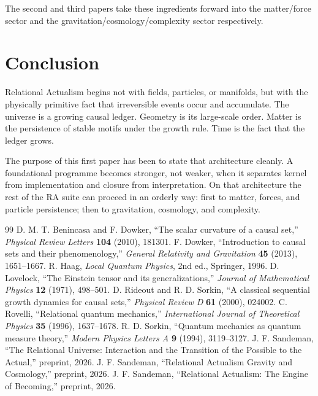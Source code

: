 \documentclass[11pt]{article}
\begin{document}
The second and third papers take these ingredients forward into the matter/force sector and the gravitation/cosmology/complexity sector respectively.

\section{Conclusion}
Relational Actualism begins not with fields, particles, or manifolds, but with the physically primitive fact that irreversible events occur and accumulate. The universe is a growing causal ledger. Geometry is its large-scale order. Matter is the persistence of stable motifs under the growth rule. Time is the fact that the ledger grows.

The purpose of this first paper has been to state that architecture cleanly. A foundational programme becomes stronger, not weaker, when it separates kernel from implementation and closure from interpretation. On that architecture the rest of the RA suite can proceed in an orderly way: first to matter, forces, and particle persistence; then to gravitation, cosmology, and complexity.

\begin{thebibliography}{99}
 D. M. T. Benincasa and F. Dowker, ``The scalar curvature of a causal set,'' \emph{Physical Review Letters} \textbf{104} (2010), 181301.
 F. Dowker, ``Introduction to causal sets and their phenomenology,'' \emph{General Relativity and Gravitation} \textbf{45} (2013), 1651--1667.
 R. Haag, \emph{Local Quantum Physics}, 2nd ed., Springer, 1996.
 D. Lovelock, ``The Einstein tensor and its generalizations,'' \emph{Journal of Mathematical Physics} \textbf{12} (1971), 498--501.
 D. Rideout and R. D. Sorkin, ``A classical sequential growth dynamics for causal sets,'' \emph{Physical Review D} \textbf{61} (2000), 024002.
 C. Rovelli, ``Relational quantum mechanics,'' \emph{International Journal of Theoretical Physics} \textbf{35} (1996), 1637--1678.
 R. D. Sorkin, ``Quantum mechanics as quantum measure theory,'' \emph{Modern Physics Letters A} \textbf{9} (1994), 3119--3127.
 J. F. Sandeman, ``The Relational Universe: Interaction and the Transition of the Possible to the Actual,'' preprint, 2026.
 J. F. Sandeman, ``Relational Actualism Gravity and Cosmology,'' preprint, 2026.
 J. F. Sandeman, ``Relational Actualism: The Engine of Becoming,'' preprint, 2026.
\end{thebibliography}
\end{document}
